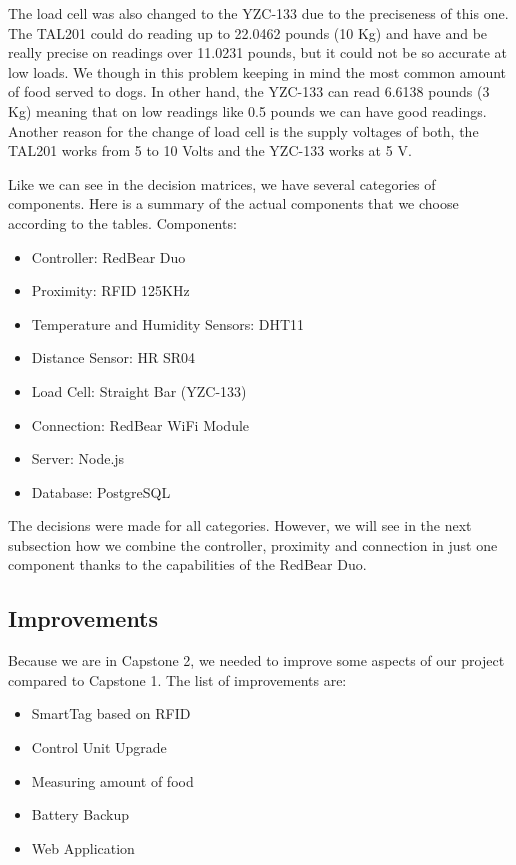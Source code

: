 \documentclass[12pt]{article}
\begin{document}
The load cell was also changed to the YZC-133 due to the preciseness of this one. The TAL201 could do reading up to 22.0462 pounds (10 Kg) and have and be really precise on readings over 11.0231 pounds, but it could not be so accurate at low loads. We though in this problem keeping in mind the most common amount of food served to dogs. In other hand, the YZC-133 can read 6.6138 pounds (3 Kg) meaning that on low readings like 0.5 pounds we can have good readings. Another reason for the change of load cell is the supply voltages of both, the TAL201 works from 5 to 10 Volts and the YZC-133 works at 5 V.

Like we can see in the decision matrices, we have several categories of components. Here is a summary of the actual components that we choose according to the tables. Components:

\begin{itemize}
  \item Controller: RedBear Duo
  \item Proximity: RFID 125KHz
  \item Temperature and Humidity Sensors: DHT11
  \item Distance Sensor: HR SR04
  \item Load Cell: Straight Bar (YZC-133)
  \item Connection: RedBear WiFi Module
  \item Server: Node.js
  \item Database: PostgreSQL
\end{itemize}

The decisions were made for all categories. However, we will see in the next subsection how we combine the controller, proximity and connection in just one component thanks to the capabilities of the RedBear Duo.

\subsection{Improvements}

Because we are in Capstone 2, we needed to improve some aspects of our project compared to Capstone 1. The list of improvements are:

\begin{itemize}
    \item SmartTag based on RFID
    \item Control Unit Upgrade
    \item Measuring amount of food
    \item Battery Backup
    \item Web Application
\end{itemize}
\end{document}
